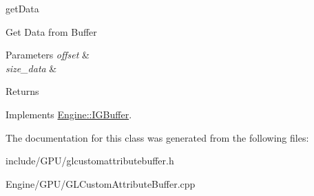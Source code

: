 get\+Data 

Get Data from Buffer 
\begin{DoxyParams}{Parameters}
{\em offset} & \\
\hline
{\em size\+\_\+data} & \\
\hline
\end{DoxyParams}
\begin{DoxyReturn}{Returns}

\end{DoxyReturn}


Implements \hyperlink{classEngine_1_1IGBuffer_a8ad52dc670797d72aabf99033d20b220}{Engine\+::\+I\+G\+Buffer}.



The documentation for this class was generated from the following files\+:\begin{DoxyCompactItemize}
\item 
include/\+G\+P\+U/glcustomattributebuffer.\+h\item 
Engine/\+G\+P\+U/G\+L\+Custom\+Attribute\+Buffer.\+cpp\end{DoxyCompactItemize}
